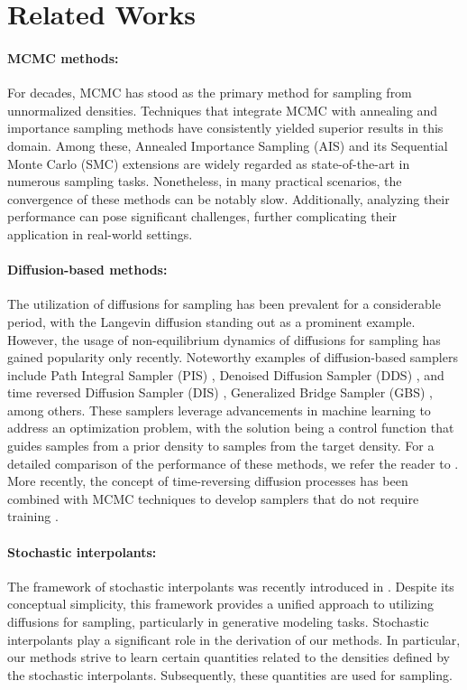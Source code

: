 \section{Related Works}
\paragraph{MCMC methods:} For decades, MCMC has stood as the primary method for sampling from unnormalized densities. Techniques that integrate MCMC with annealing and importance sampling methods have consistently yielded superior results in this domain. Among these, Annealed Importance Sampling (AIS) \cite{neal_annealed_2001} and its Sequential Monte Carlo (SMC) \cite{del_moral_sequential_2006} extensions are widely regarded as state-of-the-art in numerous sampling tasks. Nonetheless, in many practical scenarios, the convergence of these methods can be notably slow. Additionally, analyzing their performance can pose significant challenges, further complicating their application in real-world settings.
\paragraph{Diffusion-based methods:} 
The utilization of diffusions for sampling has been prevalent for a considerable period, with the Langevin diffusion standing out as a prominent example. However, the usage of non-equilibrium dynamics of diffusions for sampling has gained popularity only recently. Noteworthy examples of diffusion-based samplers include Path Integral Sampler (PIS) \cite{zhang_path_2022}, Denoised Diffusion Sampler (DDS) \cite{vargas_denoising_2022}, and time reversed Diffusion Sampler (DIS) \cite{berner_optimal_2023}, Generalized Bridge Sampler (GBS) \cite{richter_improved_2023}, among others. These samplers leverage advancements in machine learning to address an optimization problem, with the solution being a control function that guides samples from a prior density to samples from the target density. For a detailed comparison of the performance of these methods, we refer the reader to \cite{blessing_beyond_2024}. More recently, the concept of time-reversing diffusion processes has been combined with MCMC techniques to develop samplers that do not require training \cite{grenioux_stochastic_2024,huang_reverse_2023}.
\paragraph{Stochastic interpolants:} 
The framework of stochastic interpolants was recently introduced in \cite{albergo_stochastic_2023}. Despite its conceptual simplicity, this framework provides a unified approach to utilizing diffusions for sampling, particularly in generative modeling tasks. Stochastic interpolants play a significant role in the derivation of our methods. In particular, our methods strive to learn certain quantities related to the densities defined by the stochastic interpolants. Subsequently, these quantities are used for sampling.
